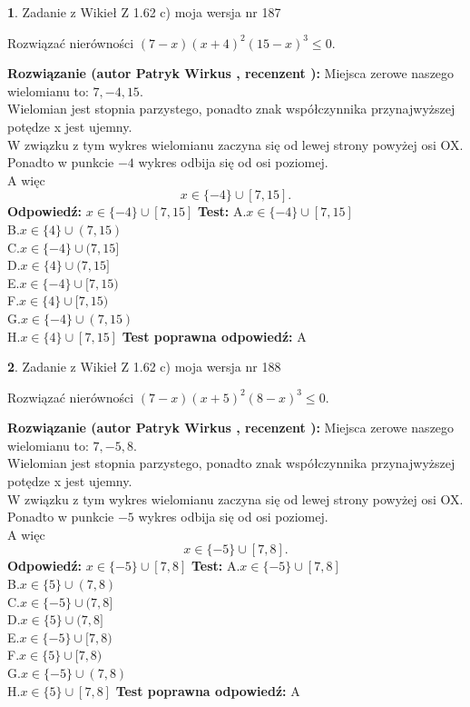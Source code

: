 \documentclass[12pt, a4paper]{article}
\theoremstyle{definition} %
\newtheorem{zad}{}
\newcommand{\zadStart}[1]{\begin{zad}#1\newline}
\newcommand{\zadStop}{\end{zad}}
\newcommand{\rozwStart}[2]{\noindent \textbf{Rozwiązanie (autor #1 , recenzent #2): }\newline}
\newcommand{\rozwStop}{\newline}
\newcommand{\odpStart}{\noindent \textbf{Odpowiedź:}\newline}
\newcommand{\odpStop}{\newline}
\newcommand{\testStart}{\noindent \textbf{Test:}\newline}
\newcommand{\testStop}{\newline}
\newcommand{\kluczStart}{\noindent \textbf{Test poprawna odpowiedź:}\newline}
\newcommand{\kluczStop}{\newline}
\begin{document}
\zadStart{Zadanie z Wikieł Z 1.62 c) moja wersja nr 187}

Rozwiązać nierówności $(7-x)(x+4)^{2}(15-x)^{3}\le0$.
\zadStop
\rozwStart{Patryk Wirkus}{}
Miejsca zerowe naszego wielomianu to: $7, -4, 15$.\\
Wielomian jest stopnia parzystego, ponadto znak współczynnika przy\linebreak najwyższej potędze x jest ujemny.\\ W związku z tym wykres wielomianu zaczyna się od lewej strony powyżej osi OX.\\
Ponadto w punkcie $-4$ wykres odbija się od osi poziomej.\\
A więc $$x \in \{-4\} \cup [7,15].$$
\rozwStop
\odpStart
$x \in \{-4\} \cup [7,15]$
\odpStop
\testStart
A.$x \in \{-4\} \cup [7,15]$\\
B.$x \in \{4\} \cup (7,15)$\\
C.$x \in \{-4\} \cup (7,15]$\\
D.$x \in \{4\} \cup (7,15]$\\
E.$x \in \{-4\} \cup [7,15)$\\
F.$x \in \{4\} \cup [7,15)$\\
G.$x \in \{-4\} \cup (7,15)$\\
H.$x \in \{4\} \cup [7,15]$
\testStop
\kluczStart
A
\kluczStop



\zadStart{Zadanie z Wikieł Z 1.62 c) moja wersja nr 188}

Rozwiązać nierówności $(7-x)(x+5)^{2}(8-x)^{3}\le0$.
\zadStop
\rozwStart{Patryk Wirkus}{}
Miejsca zerowe naszego wielomianu to: $7, -5, 8$.\\
Wielomian jest stopnia parzystego, ponadto znak współczynnika przy\linebreak najwyższej potędze x jest ujemny.\\ W związku z tym wykres wielomianu zaczyna się od lewej strony powyżej osi OX.\\
Ponadto w punkcie $-5$ wykres odbija się od osi poziomej.\\
A więc $$x \in \{-5\} \cup [7,8].$$
\rozwStop
\odpStart
$x \in \{-5\} \cup [7,8]$
\odpStop
\testStart
A.$x \in \{-5\} \cup [7,8]$\\
B.$x \in \{5\} \cup (7,8)$\\
C.$x \in \{-5\} \cup (7,8]$\\
D.$x \in \{5\} \cup (7,8]$\\
E.$x \in \{-5\} \cup [7,8)$\\
F.$x \in \{5\} \cup [7,8)$\\
G.$x \in \{-5\} \cup (7,8)$\\
H.$x \in \{5\} \cup [7,8]$
\testStop
\kluczStart
A
\kluczStop
\end{document}

